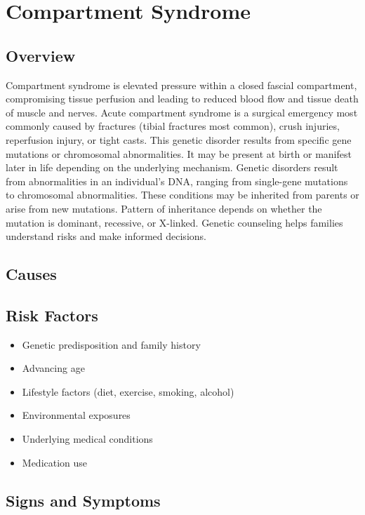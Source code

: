 \chapter{Compartment Syndrome}
\label{sec:Compartment Syndrome}

\section{Overview}
Compartment syndrome is elevated pressure within a closed fascial compartment, compromising tissue perfusion and leading to reduced blood flow and tissue death of muscle and nerves. Acute compartment syndrome is a surgical emergency most commonly caused by fractures (tibial fractures most common), crush injuries, reperfusion injury, or tight casts. This genetic disorder results from specific gene mutations or chromosomal abnormalities. It may be present at birth or manifest later in life depending on the underlying mechanism. Genetic disorders result from abnormalities in an individual's DNA, ranging from single-gene mutations to chromosomal abnormalities. These conditions may be inherited from parents or arise from new mutations. Pattern of inheritance depends on whether the mutation is dominant, recessive, or X-linked. Genetic counseling helps families understand risks and make informed decisions.
\section{Causes}
\section{Risk Factors}

\begin{itemize}[noitemsep]
  \item Genetic predisposition and family history
  \item Advancing age
  \item Lifestyle factors (diet, exercise, smoking, alcohol)
  \item Environmental exposures
  \item Underlying medical conditions
  \item Medication use
\end{itemize}
\section{Signs and Symptoms}

